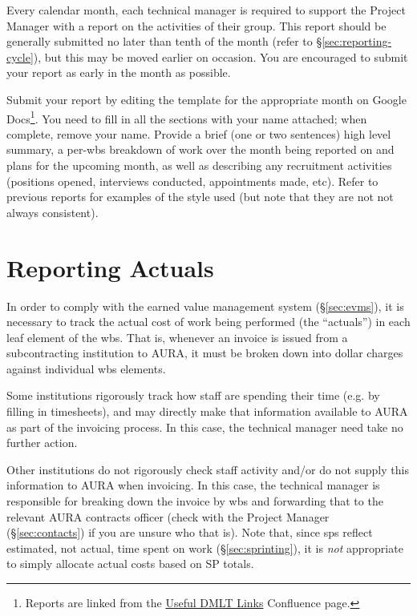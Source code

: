 Every calendar month, each technical manager is required to support the
Project Manager with a report on the activities of their group. This
report should be generally submitted no later than tenth of the month
(refer to \S\ref{sec:reporting-cycle}), but this may be moved earlier on
occasion. You are encouraged to submit your report as early in the month
as possible.

Submit your report by editing the template for the appropriate month on Google Docs\footnote{Reports are linked from the \href{https://confluence.lsstcorp.org/display/DM/Useful+DMLT+Links}{Useful DMLT Links} Confluence page.}.
You need to fill in all the sections with your name attached; when complete, remove your name.
Provide a brief (one or two sentences) high level summary, a per-\gls{wbs} breakdown of work over the month being reported on and plans for the upcoming month, as well as describing any recruitment activities (positions opened, interviews conducted, appointments made, etc).
Refer to previous reports for examples of the style used (but note that they are not not always consistent).

\section{Reporting Actuals}
\label{sec:actuals}

In order to comply with the earned value management system (\S\ref{sec:evms}), it is necessary to track the actual cost of work being performed (the ``actuals'') in each leaf \gls{element} of the \gls{wbs}.
That is, whenever an invoice is issued from a subcontracting institution to AURA, it must be broken down into dollar charges against individual \gls{wbs} elements.

Some institutions rigorously track how staff are spending their time
(e.g. by filling in timesheets), and may directly make that information
available to AURA as part of the invoicing process. In this case, the
technical manager need take no further action.

Other institutions do not rigorously check staff activity and/or do not supply this information to AURA when invoicing.
In this case, the technical manager is responsible for breaking down the invoice by \gls{wbs} and forwarding that to the relevant AURA contracts officer (check with the Project Manager (\S\ref{sec:contacts}) if you are unsure who that is).
Note that, since \glspl{sp} reflect estimated, not actual, time spent on work (\S\ref{sec:sprinting}), it is \emph{not} appropriate to simply allocate actual costs based on SP totals.

